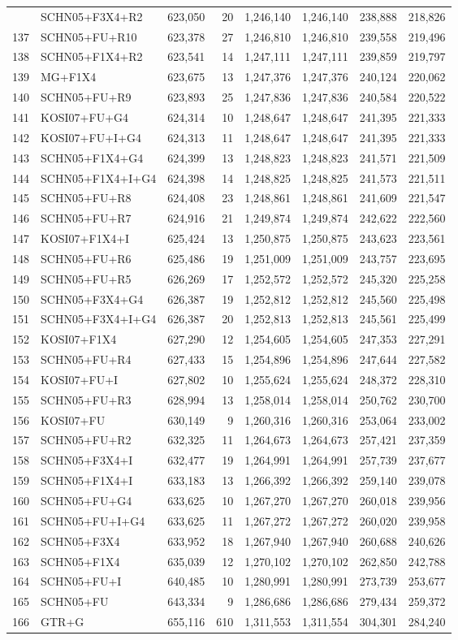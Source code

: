 \begin{longtable}{rlrrrrrr}
{136&SCHN05+F3X4+R2&623,050&20&1,246,140&1,246,140&238,888&218,826\\
137&SCHN05+FU+R10&623,378&27&1,246,810&1,246,810&239,558&219,496\\
138&SCHN05+F1X4+R2&623,541&14&1,247,111&1,247,111&239,859&219,797\\
139&MG+F1X4&623,675&13&1,247,376&1,247,376&240,124&220,062\\
140&SCHN05+FU+R9&623,893&25&1,247,836&1,247,836&240,584&220,522\\
141&KOSI07+FU+G4&624,314&10&1,248,647&1,248,647&241,395&221,333\\
142&KOSI07+FU+I+G4&624,313&11&1,248,647&1,248,647&241,395&221,333\\
143&SCHN05+F1X4+G4&624,399&13&1,248,823&1,248,823&241,571&221,509\\
144&SCHN05+F1X4+I+G4&624,398&14&1,248,825&1,248,825&241,573&221,511\\
145&SCHN05+FU+R8&624,408&23&1,248,861&1,248,861&241,609&221,547\\
146&SCHN05+FU+R7&624,916&21&1,249,874&1,249,874&242,622&222,560\\
147&KOSI07+F1X4+I&625,424&13&1,250,875&1,250,875&243,623&223,561\\
148&SCHN05+FU+R6&625,486&19&1,251,009&1,251,009&243,757&223,695\\
149&SCHN05+FU+R5&626,269&17&1,252,572&1,252,572&245,320&225,258\\
150&SCHN05+F3X4+G4&626,387&19&1,252,812&1,252,812&245,560&225,498\\
151&SCHN05+F3X4+I+G4&626,387&20&1,252,813&1,252,813&245,561&225,499\\
152&KOSI07+F1X4&627,290&12&1,254,605&1,254,605&247,353&227,291\\
153&SCHN05+FU+R4&627,433&15&1,254,896&1,254,896&247,644&227,582\\
154&KOSI07+FU+I&627,802&10&1,255,624&1,255,624&248,372&228,310\\
155&SCHN05+FU+R3&628,994&13&1,258,014&1,258,014&250,762&230,700\\
156&KOSI07+FU&630,149&9&1,260,316&1,260,316&253,064&233,002\\
157&SCHN05+FU+R2&632,325&11&1,264,673&1,264,673&257,421&237,359\\
158&SCHN05+F3X4+I&632,477&19&1,264,991&1,264,991&257,739&237,677\\
159&SCHN05+F1X4+I&633,183&13&1,266,392&1,266,392&259,140&239,078\\
160&SCHN05+FU+G4&633,625&10&1,267,270&1,267,270&260,018&239,956\\
161&SCHN05+FU+I+G4&633,625&11&1,267,272&1,267,272&260,020&239,958\\
162&SCHN05+F3X4&633,952&18&1,267,940&1,267,940&260,688&240,626\\
163&SCHN05+F1X4&635,039&12&1,270,102&1,270,102&262,850&242,788\\
164&SCHN05+FU+I&640,485&10&1,280,991&1,280,991&273,739&253,677\\
165&SCHN05+FU&643,334&9&1,286,686&1,286,686&279,434&259,372\\
166&GTR+G&655,116&610&1,311,553&1,311,554&304,301&284,240
\end{longtable}

